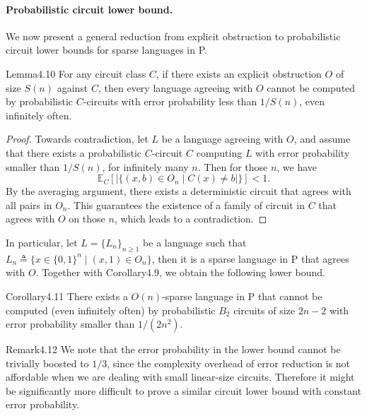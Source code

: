 \paragraph{Probabilistic circuit lower bound.} We now present a general reduction from explicit obstruction to probabilistic circuit lower bounds for sparse languages in P.
\begin{authorclaim}{Lemma4.10}
For any circuit class $C$, if there exists an explicit obstruction $O$ of size $S(n)$ against $C$, then every language agreeing with $O$ cannot be computed by probabilistic $C$-circuits with error probability less than $1/S(n)$, even infinitely often.
\end{authorclaim}
\begin{proof}
Towards contradiction, let $L$ be a language agreeing with $O$, and assume that there exists a probabilistic $C$-circuit $C$ computing $L$ with error probability smaller than $1/S(n)$, for infinitely many $n$. Then for those $n$, we have
\[\mathbb E_C[|\{(x,b)\in O_n\mid C(x)\ne b|\}]<1.\]
By the averaging argument, there exists a deterministic circuit that agrees with all pairs in $O_n$. This guarantees the existence of a family of circuit in $C$ that agrees with $O$ on those $n$, which leads to a contradiction.
\end{proof}
In particular, let $L=\{L_n\}_{n\ge1}$ be a language such that $L_n\triangleq\{x\in\{0,1\}^n\mid(x,1)\in O_n\}$, then it is a sparse language in P that agrees with $O$. Together with Corollary4.9, we obtain the following lower bound.
\begin{authorclaim}{Corollary4.11}
There exists a $O(n)$-sparse language in P that cannot be computed (even infinitely often) by probabilistic $B_2$ circuits of size $2n-2$ with error probability smaller than $1/(2n^2)$.
\end{authorclaim}
\begin{authorclaim}{Remark4.12}
We note that the error probability in the lower bound cannot be trivially boosted to $1/3$, since the complexity overhead of error reduction is not affordable when we are dealing with small linear-size circuits. Therefore it might be significantly more difficult to prove a similar circuit lower bound with constant error probability.
\end{authorclaim}

